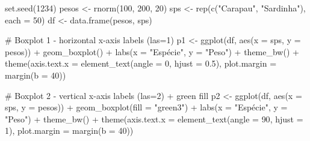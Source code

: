 \documentclass[
  letterpaper,
  DIV=11,
  numbers=noendperiod]{scrartcl}
\newenvironment{Shaded}{\begin{snugshade}}{\end{snugshade}}
\newcommand{\AttributeTok}[1]{\textcolor[rgb]{0.40,0.45,0.13}{#1}}
\newcommand{\CommentTok}[1]{\textcolor[rgb]{0.37,0.37,0.37}{#1}}
\newcommand{\DecValTok}[1]{\textcolor[rgb]{0.68,0.00,0.00}{#1}}
\newcommand{\FloatTok}[1]{\textcolor[rgb]{0.68,0.00,0.00}{#1}}
\newcommand{\FunctionTok}[1]{\textcolor[rgb]{0.28,0.35,0.67}{#1}}
\newcommand{\NormalTok}[1]{\textcolor[rgb]{0.00,0.23,0.31}{#1}}
\newcommand{\OtherTok}[1]{\textcolor[rgb]{0.00,0.23,0.31}{#1}}
\newcommand{\SpecialCharTok}[1]{\textcolor[rgb]{0.37,0.37,0.37}{#1}}
\newcommand{\StringTok}[1]{\textcolor[rgb]{0.13,0.47,0.30}{#1}}
\begin{document}
\begin{Shaded}
\begin{Highlighting}[]
\FunctionTok{set.seed}\NormalTok{(}\DecValTok{1234}\NormalTok{)}
\NormalTok{pesos }\OtherTok{\textless{}{-}} \FunctionTok{rnorm}\NormalTok{(}\DecValTok{100}\NormalTok{, }\DecValTok{200}\NormalTok{, }\DecValTok{20}\NormalTok{)}
\NormalTok{sps   }\OtherTok{\textless{}{-}} \FunctionTok{rep}\NormalTok{(}\FunctionTok{c}\NormalTok{(}\StringTok{"Carapau"}\NormalTok{, }\StringTok{"Sardinha"}\NormalTok{), }\AttributeTok{each =} \DecValTok{50}\NormalTok{)}
\NormalTok{df    }\OtherTok{\textless{}{-}} \FunctionTok{data.frame}\NormalTok{(pesos, sps)}

\CommentTok{\# Boxplot 1 {-} horizontal x{-}axis labels (las=1)}
\NormalTok{p1 }\OtherTok{\textless{}{-}} \FunctionTok{ggplot}\NormalTok{(df, }\FunctionTok{aes}\NormalTok{(}\AttributeTok{x =}\NormalTok{ sps, }\AttributeTok{y =}\NormalTok{ pesos)) }\SpecialCharTok{+}
  \FunctionTok{geom\_boxplot}\NormalTok{() }\SpecialCharTok{+}
  \FunctionTok{labs}\NormalTok{(}\AttributeTok{x =} \StringTok{"Espécie"}\NormalTok{, }\AttributeTok{y =} \StringTok{"Peso"}\NormalTok{) }\SpecialCharTok{+}
  \FunctionTok{theme\_bw}\NormalTok{() }\SpecialCharTok{+}
  \FunctionTok{theme}\NormalTok{(}\AttributeTok{axis.text.x =} \FunctionTok{element\_text}\NormalTok{(}\AttributeTok{angle =} \DecValTok{0}\NormalTok{, }\AttributeTok{hjust =} \FloatTok{0.5}\NormalTok{),}
        \AttributeTok{plot.margin =} \FunctionTok{margin}\NormalTok{(}\AttributeTok{b =} \DecValTok{40}\NormalTok{))}

\CommentTok{\# Boxplot 2 {-} vertical x{-}axis labels (las=2) + green fill}
\NormalTok{p2 }\OtherTok{\textless{}{-}} \FunctionTok{ggplot}\NormalTok{(df, }\FunctionTok{aes}\NormalTok{(}\AttributeTok{x =}\NormalTok{ sps, }\AttributeTok{y =}\NormalTok{ pesos)) }\SpecialCharTok{+}
  \FunctionTok{geom\_boxplot}\NormalTok{(}\AttributeTok{fill =} \StringTok{"green3"}\NormalTok{) }\SpecialCharTok{+}
  \FunctionTok{labs}\NormalTok{(}\AttributeTok{x =} \StringTok{"Espécie"}\NormalTok{, }\AttributeTok{y =} \StringTok{"Peso"}\NormalTok{) }\SpecialCharTok{+}
  \FunctionTok{theme\_bw}\NormalTok{() }\SpecialCharTok{+}
  \FunctionTok{theme}\NormalTok{(}\AttributeTok{axis.text.x =} \FunctionTok{element\_text}\NormalTok{(}\AttributeTok{angle =} \DecValTok{90}\NormalTok{, }\AttributeTok{hjust =} \DecValTok{1}\NormalTok{),}
        \AttributeTok{plot.margin =} \FunctionTok{margin}\NormalTok{(}\AttributeTok{b =} \DecValTok{40}\NormalTok{))}


\end{Highlighting}
\end{Shaded}
\end{document}
